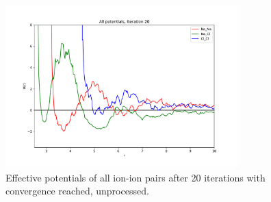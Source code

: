 \documentclass[10pt]{article}
\begin{document}
        \begin{figure}[H]
            \centering
            \includegraphics[width = 0.8\textwidth]{iters_all_20.pdf}
            \caption{Effective potentials of all ion-ion pairs after 20 iterations with convergence reached, unprocessed.}
            \label{fig:allpot_unproc}
        \end{figure}
        
        \newpage
\end{document}
